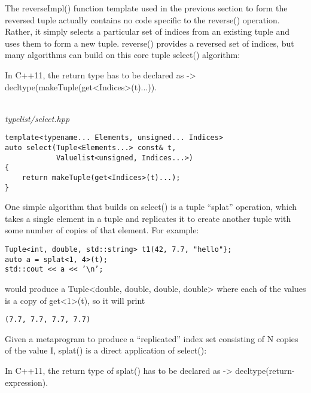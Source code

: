 
The reverseImpl() function template used in the previous section to form the reversed tuple actually contains no code specific to the reverse() operation. Rather, it simply selects a particular set of indices from an existing tuple and uses them to form a new tuple. reverse() provides a reversed set of indices, but many algorithms can build on this core tuple select() algorithm:

\begin{tcolorbox}[colback=webgreen!5!white,colframe=webgreen!75!black]
\hspace*{0.75cm}In C++11, the return type has to be declared as -> decltype(makeTuple(get<Indices>(t)...)).
\end{tcolorbox}

\hspace*{\fill} \\ %
\noindent
\textit{typelist/select.hpp}
\begin{lstlisting}[style=styleCXX]
template<typename... Elements, unsigned... Indices>
auto select(Tuple<Elements...> const& t,
			Valuelist<unsigned, Indices...>)
{
	return makeTuple(get<Indices>(t)...);
}
\end{lstlisting}

One simple algorithm that builds on select() is a tuple “splat” operation, which takes a single element in a tuple and replicates it to create another tuple with some number of copies of that element. For example:

\begin{lstlisting}[style=styleCXX]
Tuple<int, double, std::string> t1(42, 7.7, "hello"};
auto a = splat<1, 4>(t);
std::cout << a << ’\n’;
\end{lstlisting}

would produce a Tuple<double, double, double, double> where each of the values is a copy of get<1>(t), so it will print

\begin{lstlisting}[style=styleCXX]
(7.7, 7.7, 7.7, 7.7)
\end{lstlisting}

Given a metaprogram to produce a “replicated” index set consisting of N copies of the value I, splat() is a direct application of select():

\begin{tcolorbox}[colback=webgreen!5!white,colframe=webgreen!75!black]
\hspace*{0.75cm}In C++11, the return type of splat() has to be declared as -> decltype(return-expression).
\end{tcolorbox}

